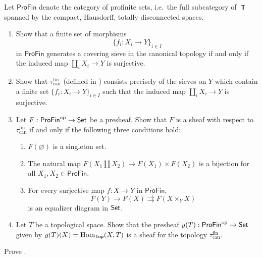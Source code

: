 \begin{exercise}\label{exercise:chap:sheaves:sec:sites:condensed sets}
    Let $\mathsf{ProFin}$ denote the category of profinite sets, i.e.\ the full subcategory of $\Top$ spanned by the compact, Hausdorff, totally disconnected spaces.
    \begin{enumerate}[label=(\alph*)]
        \item Show that a finite set of morphisms
              \[\{f_i : X_i \to Y\}_{i \in I}\]
              in $\mathsf{ProFin}$ generates a covering sieve in the canonical topology if and only if the induced map $\coprod_i X_i \to Y$ is surjective.
        \item Show that $\tau_{\mathrm{can}}^{\mathrm{fin}}$ (defined in ) consists precisely of the sieves on $Y$ which contain a finite set $\{f_i : X_i \to Y\}_{i \in I}$ such that the induced map $\coprod_i X_i \to Y$ is surjective.
        \item Let $F : \mathsf{ProFin}^{\mathrm{op}} \to \mathsf{Set}$ be a presheaf. Show that $F$ is a sheaf with respect to $\tau_{\mathrm{can}}^{\mathrm{fin}}$ if and only if the following three conditions hold:
              \begin{enumerate}[label=(\roman*)]
                  \item $F(\varnothing)$ is a singleton set.
                  \item The natural map $F(X_1 \amalg X_2) \to F(X_1) \times F(X_2)$ is a bijection for all $X_1, X_2 \in \mathsf{ProFin}$.
                  \item For every surjective map $f : X \to Y$ in $\mathsf{ProFin}$,
                        \[F(Y) \to F(X) \rightrightarrows F(X \times_Y X)\]
                        is an equalizer diagram in $\mathsf{Set}$.
              \end{enumerate}
        \item Let $T$ be a topological space. Show that the presheaf $y(T) : \mathsf{ProFin}^{\mathrm{op}} \to \mathsf{Set}$ given by $y(T)(X) = \operatorname{Hom}_{\mathsf{Top}}(X,T)$ is a sheaf for the topology $\tau_{\mathrm{can}}^{\mathrm{fin}}$.
    \end{enumerate}
\end{exercise}

\begin{exercise}\label{exercise:chap:sheaves:sec:sites:prove plus construction is a presheaf}
    Prove .
\end{exercise}

